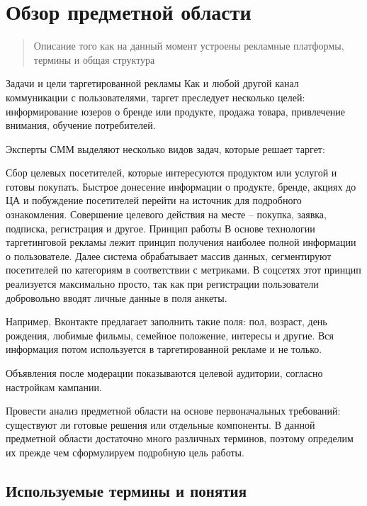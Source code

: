 \documentclass[times]{itmo-student-thesis}
\begin{document}




\chapter{Обзор предметной области}


\startrelatedwork %

\begin{quotation}
  Описание того как на данный момент устроены рекламные платформы, термины и общая структура
\end{quotation}

Задачи и цели таргетированной рекламы
Как и любой другой канал коммуникации с пользователями, таргет преследует несколько целей: информирование юзеров о бренде или продукте, продажа товара, привлечение внимания, обучение потребителей.

Эксперты СММ выделяют несколько видов задач, которые решает таргет:

Сбор целевых посетителей, которые интересуются продуктом или услугой и готовы покупать.
Быстрое донесение информации о продукте, бренде, акциях до ЦА и побуждение посетителей перейти на источник для подробного ознакомления.
Совершение целевого действия на месте – покупка, заявка, подписка, регистрация и другое.
Принцип работы
В основе технологии таргетинговой рекламы лежит принцип получения наиболее полной информации о пользователе. Далее система обрабатывает массив данных, сегментируют посетителей по категориям в соответствии с метриками. В соцсетях этот принцип реализуется максимально просто, так как при регистрации пользователи добровольно вводят личные данные в поля анкеты.

Например, Вконтакте предлагает заполнить такие поля: пол, возраст, день рождения, любимые фильмы, семейное положение, интересы и другие. Вся информация потом используется в таргетированной рекламе и не только.

Объявления после модерации показываются целевой аудитории, согласно настройкам кампании.

	



Провести анализ предметной области на основе первоначальных требований: существуют ли готовые решения или отдельные компоненты.
В данной предметной области достаточно много различных терминов, поэтому 
определим их прежде чем сформулируем подробную цель работы.

\section{Используемые термины и понятия}\label{sec:terms}
\end{document}

